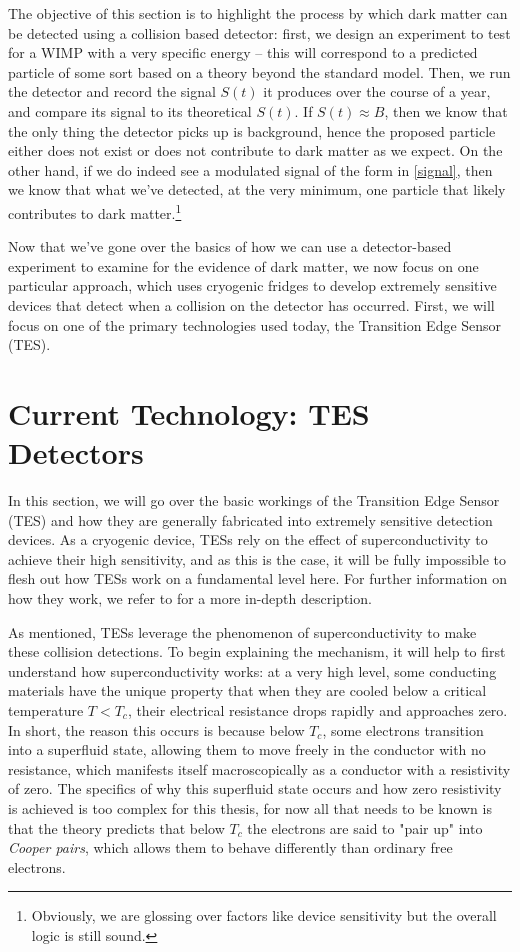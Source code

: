 The objective of this section is to highlight the process by which dark matter can be detected using a
collision based detector: first, we design an experiment to test for a WIMP with a very specific energy --
this will correspond to a predicted particle of some sort based on a theory beyond the standard model. Then,
we run the detector and record the signal \( S(t) \) it produces over the course of a year, and compare its
signal to its theoretical \( S(t) \). If \( S(t) \approx B \), then we know that the only thing the detector
picks up is background, hence the proposed particle either does not exist or does not contribute to dark
matter as we expect. On the other hand, if we do indeed see a modulated signal of the form in \cref{signal},
then we know that what we've detected, at the very minimum, one particle that likely contributes to dark
matter.\footnote{Obviously, we are glossing over factors like device sensitivity but the overall logic is
still sound.}  
 
Now that we've gone over the basics of how we can use a detector-based experiment to examine for the evidence
of dark matter, we now focus on one particular approach, which uses cryogenic fridges to develop extremely
sensitive devices that detect when a collision on the detector has occurred. First, we will focus on one of
the primary technologies used today, the Transition Edge Sensor (TES).  

\section{Current Technology: TES Detectors}
\label{TES}

In this section, we will go over the basic workings of the Transition Edge Sensor (TES) and how they are
generally fabricated into extremely sensitive detection devices. As a cryogenic device, TESs rely on the
effect of superconductivity to achieve their high sensitivity, and as this is the case, it will be fully
impossible to flesh out how TESs work on a fundamental level here. 
For further information on how they work, we refer to \cite{luciaTransitionEdgeSensors2024} for a more 
in-depth description.
  
As mentioned, TESs leverage the phenomenon of superconductivity to make these collision detections. To begin
explaining the mechanism, it will help to first understand how superconductivity works: at a very high level,
some conducting materials have the unique property that when they are cooled below a critical temperature 
\( T < T_c \), their electrical resistance drops rapidly and approaches zero. In short, the reason this
occurs is because below \( T_c \), some electrons transition into a superfluid state, allowing them to move
freely in the conductor with no resistance, which manifests itself macroscopically as a conductor with
a resistivity of zero. The specifics of why this superfluid state occurs and how zero resistivity is achieved
is too complex for this thesis, for now all that needs to be known is that the theory predicts that below \(
T_c \) the electrons are said to "pair up" into \textit{Cooper pairs}, which allows them to behave 
differently than ordinary free electrons.       

